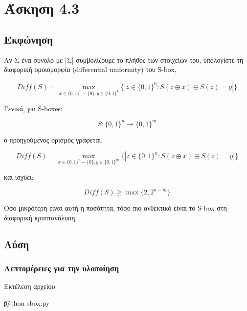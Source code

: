 \section{Άσκηση 4.3}

\subsection{Εκφώνηση}

Αν Σ ένα σύνολο με |Σ| συμβολίζουμε το πλήϑος των στοιχείων του, υπολογίστε τη διαφορική ομοιομορφία (differential uniformity) του S-box,

\begin{equation} \label{eq:811}
     Diff(S) = \max_{x \in \{0,1\}^6 - \{0\}, y\in \{0,1\}^4} \{|z \in \{0,1\}^6 : S(z \oplus x) \oplus S(z) = y|\}
\end{equation}

Γενικά, για S-boxes:

\begin{equation}
    S : \{0, 1\}^n \rightarrow \{0, 1\}^m
\end{equation}

ο προηγούμενος ορισμός γράφεται:

\begin{equation}
     Diff(S) = \max_{x \in \{0,1\}^n - \{0\}, y\in \{0,1\}^m} \{|z \in \{0,1\}^n : S(z \oplus x) \oplus S(z) = y|\}
\end{equation}

και ισχύει:

\begin{equation}\label{eq:813}
    Diff(S) \ge \max \{2, 2^{n-m}\}
\end{equation}

Όσο μικρότερη είναι αυτή η ποσότητα, τόσο πιο ανθεκτικό είναι το S-box στη διαφορική κρυπτανάλυση.

\subsection{Λύση} 

\subsubsection{Λεπτομέρειες για την υλοποίηση}

Εκτέλεση αρχείου:

\begin{center}
    \t{python sbox.py}
\end{center}

